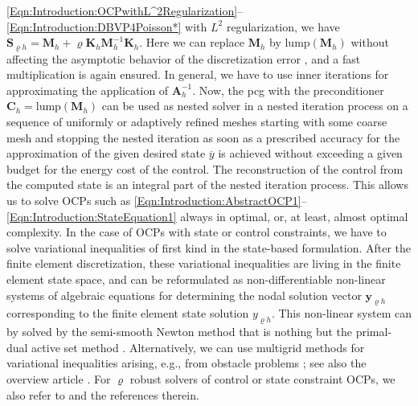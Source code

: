\documentclass{article}
\numberwithin{equation}{section}
\begin{document}
\eqref{Eqn:Introduction:OCPwithL^2Regularization}--\eqref{Eqn:Introduction:DBVP4Poisson*}
with $L^2$ regularization, we have
$\mathbf{S}_{\varrho h} = \mathbf{M}_h + \varrho \mathbf{K}_h
\mathbf{M}_h^{-1} \mathbf{K}_h$. Here we can replace
$\mathbf{M}_h$ by $\mbox{lump}(\mathbf{M}_h)$ without affecting the
asymptotic behavior of the discretization error 
\cite{LangerLoescherSteinbachYang:2024NLA}, and a fast multiplication is
again  ensured. In general, we have to use inner iterations for
approximating the application of $\mathbf{A}_h^{-1}$.
Now, the pcg with the preconditioner $\mathbf{C}_h = \mbox{lump}(\mathbf{M}_h)$ 
can be used as nested solver in a nested iteration process on a sequence of 
uniformly or adaptively refined meshes starting with some coarse mesh 
and stopping the nested iteration as soon as a prescribed accuracy 
for the approximation of the given desired state $\overline{y}$ is
achieved without exceeding a given budget for the energy cost of the control.
The reconstruction of the control from the computed state is an integral part 
of the nested iteration process. This allows us to solve OCPs such as 
\eqref{Eqn:Introduction:AbstractOCP1}--\eqref{Eqn:Introduction:StateEquation1}
always in optimal, or, at least, almost optimal complexity.
In the case of OCPs with state or control constraints, we have to solve 
variational inequalities of first kind in the state-based formulation.
After the finite element discretization, these variational inequalities 
are living in the finite element state space, and can be reformulated 
as non-differentiable non-linear systems of algebraic equations for determining 
the nodal solution vector $\mathbf{y}_{\varrho h}$ corresponding to 
the finite element state solution $y_{\varrho h}$.
This non-linear system can by solved by the semi-smooth Newton method
that is nothing but the primal-dual active set method
\cite{HintermuellerItoKunisch2003SJO}. Alternatively, we can use
multigrid methods for variational inequalities arising, e.g.,
from obstacle problems \cite{HackbuschMittelmann1983NumerMath};
see also the overview article  \cite{GraeserKornhuber2009JCM}.
For $\varrho$ robust solvers of control or state constraint OCPs,
we also refer to 
\cite{AxelssonNeytchevaStroem2018JNM,DravinsNeytcheva2023Calcolo,
StollWathen:2012NLA} and the references therein.
\end{document}

